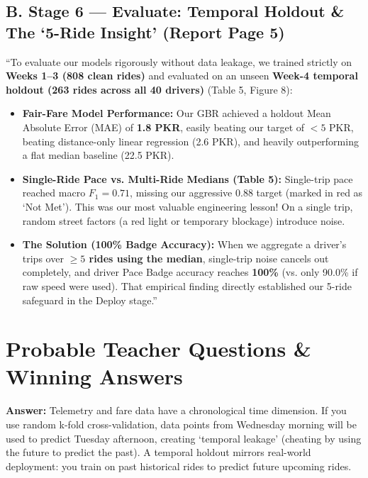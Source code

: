 \documentclass[10pt, a4paper]{article}
\begin{document}
\subsection{B. Stage 6 --- Evaluate: Temporal Holdout \& The `5-Ride Insight' (Report Page 5)}
\begin{speaking}
\footnotesize
``To evaluate our models rigorously without data leakage, we trained strictly on \textbf{Weeks 1--3 (808 clean rides)} and evaluated on an unseen \textbf{Week-4 temporal holdout (263 rides across all 40 drivers)} (Table 5, Figure 8):
\begin{itemize}\setlength{\itemsep}{0.8pt}\setlength{\parskip}{0pt}
  \item \textbf{Fair-Fare Model Performance:} Our GBR achieved a holdout Mean Absolute Error (MAE) of \textbf{1.8 PKR}, easily beating our target of \(< 5\) PKR, beating distance-only linear regression (2.6 PKR), and heavily outperforming a flat median baseline (22.5 PKR).
  \item \textbf{Single-Ride Pace vs. Multi-Ride Medians (Table 5):} Single-trip pace reached macro \(F_1 = \mathbf{0.71}\), missing our aggressive \(0.88\) target (marked in red as `Not Met'). This was our most valuable engineering lesson! On a single trip, random street factors (a red light or temporary blockage) introduce noise.
  \item \textbf{The Solution (100\% Badge Accuracy):} When we aggregate a driver's trips over \textbf{\(\ge 5\) rides using the median}, single-trip noise cancels out completely, and driver Pace Badge accuracy reaches \textbf{100\%} (vs. only 90.0\% if raw speed were used). That empirical finding directly established our 5-ride safeguard in the Deploy stage.''
\end{itemize}
\end{speaking}

\newpage

\section{Probable Teacher Questions \& Winning Answers}

\begin{qa}
\footnotesize
\textbf{Answer:} Telemetry and fare data have a chronological time dimension. If you use random k-fold cross-validation, data points from Wednesday morning will be used to predict Tuesday afternoon, creating `temporal leakage' (cheating by using the future to predict the past). A temporal holdout mirrors real-world deployment: you train on past historical rides to predict future upcoming rides.
\end{qa}
\end{document}
